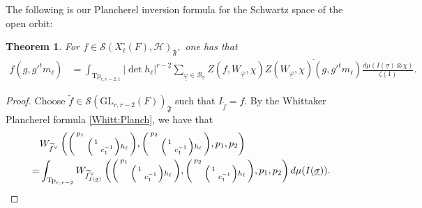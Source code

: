 \documentclass[12pt]{amsart}
\newtheorem{thm}{Theorem}[section]
\theoremstyle{remark}
\numberwithin{equation}{section}
\newcommand{\GL}{\mathrm{GL}}
\theoremstyle{definition}
\newenvironment{psmatrix}
  {\left(\begin{smallmatrix}}
  {\end{smallmatrix}\right)}
\numberwithin{equation}{subsection}
\begin{document}
The following is our Plancherel inversion formula for the Schwartz space of the open orbit:
\begin{thm} \label{thm:Plancherel} 
For $f \in \mathcal{S}(X^\circ_{\ell}(F),\mathcal{H})_{\mathfrak{F}},$ one has  that
\begin{align*}
    f(g,g'^tm_{\ell})
    &=\int_{\mathrm{Tp}_{r,r-2,1}} |\det h_\ell|^{r-2}\sum_{\underline{\varphi} \in \mathcal{B}_{\underline{\sigma}}}
        Z(f,W_{\underline{\varphi}},\chi)\overline{Z(W_{\underline{\varphi}},\chi)(g,g'^tm_{\ell})}\frac{d\mu(I(\underline{\sigma}) \otimes \chi)}{\zeta(1)}.
\end{align*}
\end{thm}
\begin{proof}
 Choose $\widetilde{f} \in \mathcal{S}(\GL_{r,r-2}(F))_{\mathfrak{F}}$ such that $I_{\widetilde{f}}=f.$  By the Whittaker Plancherel formula \eqref{Whitt:Planch}, we have that
\begin{align*}
    &W_{\widetilde{f}^\vee}\left(\begin{psmatrix} p_1 & \\ & \begin{psmatrix} 1 & \\ & c_1^{-1}\end{psmatrix}h_\ell \end{psmatrix},\begin{psmatrix}p_2 & \\ & \begin{psmatrix} 1 & \\ & c_1^{-1}\end{psmatrix}h_\ell \end{psmatrix},p_1,p_2\right)\\
    =&\int_{\mathrm{Tp}_{r,r-2}}W_{\widetilde{f}^\vee_{ I(\underline{\sigma})}}\left(\begin{psmatrix} p_1 & \\ & \begin{psmatrix} 1 & \\ & c_1^{-1}\end{psmatrix}h_\ell \end{psmatrix},\begin{psmatrix}p_2 & \\ & \begin{psmatrix} 1 & \\ & c_1^{-1}\end{psmatrix}h_\ell \end{psmatrix},p_1,p_2\right)
    d\mu(I(\underline{\sigma})).
\end{align*}  

\end{proof}
\end{document}
